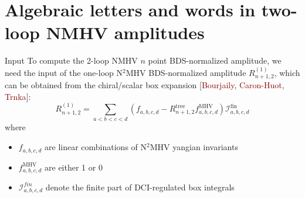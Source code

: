 \documentclass[10pt]{beamer}
\begin{document}


\section{Algebraic letters and words in two-loop NMHV amplitudes}

\begin{frame}[t]{Input}
To compute the 2-loop NMHV $n$ point BDS-normalized amplitude, we need the input of the one-loop N$^{2}$MHV BDS-normalized amplitude $R_{n+1,2}^{(1)}$, which can be obtained from the chiral/scalar box expansion {\footnotesize[\textcolor{darkred}{Bourjaily, Caron-Huot, Trnka}]}:
\begin{equation*}
  R_{n+1,2}^{(1)} =\sum_{a<b<c<d} (f_{a,b,c,d}-R_{n+1,2}^{\text{tree}} f_{a,b,c,d}^{\text{MHV}})\mathcal{I}_{a,b,c,d}^{\text{fin}}
\end{equation*}
where
\begin{itemize}
  \item $f_{a,b,c,d}$ are linear combinations of N$^{2}$MHV yangian invariants
  \item $f_{a,b,c,d}^{\text{MHV}}$ are either 1 or 0
  \item $\mathcal{I}_{a,b,c,d}^{fin}$ denote the finite part of DCI-regulated box integrals
\end{itemize}

\end{frame}
\end{document}
